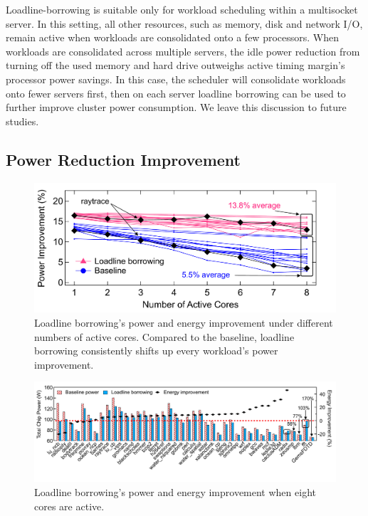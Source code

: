 Loadline-borrowing is suitable only for workload scheduling within a multisocket server. In this setting, all other resources, such as memory, disk and network I/O, remain active when workloads are consolidated onto a few processors. When workloads are consolidated across multiple servers, the idle power reduction from turning off the used memory and hard drive outweighs active timing margin's processor power savings. In this case, the scheduler will consolidate workloads onto fewer servers first, then on each server loadline borrowing can be used to further improve cluster power consumption. We leave this discussion to future studies.

\subsection{Power Reduction Improvement}
\label{sec:voltage:opt:result}

\begin{figure}[t]
\centering
    \includegraphics[trim=0 0 0 0, clip,width=0.8\linewidth]{graphs/voltage/loadline-borrowing_scale.pdf}
    \caption{Loadline borrowing's power and energy improvement under different numbers of active cores. Compared to the baseline, loadline borrowing consistently shifts up every workload's power improvement.}
    \label{fig:ll-borrow-scale}
    \vspace{-0.2cm}
\end{figure}

\begin{figure}[t]
\centering
    \vspace{0.4in}
    \includegraphics[trim=0 0 0 0,clip,width=\linewidth]{graphs/voltage/split_benefits_all.pdf}
    \caption{Loadline borrowing's power and energy improvement when eight cores are active.}
    \label{fig:ll-borrow-8core-normal}
\end{figure}

